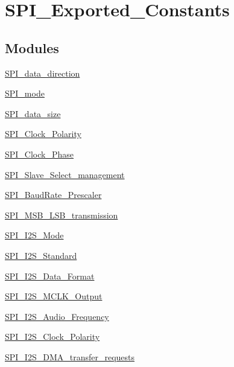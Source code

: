 \hypertarget{group___s_p_i___exported___constants}{\section{S\-P\-I\-\_\-\-Exported\-\_\-\-Constants}
\label{group___s_p_i___exported___constants}
}
\subsection*{Modules}
\begin{DoxyCompactItemize}
\item 
\hyperlink{group___s_p_i__data__direction}{S\-P\-I\-\_\-data\-\_\-direction}
\item 
\hyperlink{group___s_p_i__mode}{S\-P\-I\-\_\-mode}
\item 
\hyperlink{group___s_p_i__data__size}{S\-P\-I\-\_\-data\-\_\-size}
\item 
\hyperlink{group___s_p_i___clock___polarity}{S\-P\-I\-\_\-\-Clock\-\_\-\-Polarity}
\item 
\hyperlink{group___s_p_i___clock___phase}{S\-P\-I\-\_\-\-Clock\-\_\-\-Phase}
\item 
\hyperlink{group___s_p_i___slave___select__management}{S\-P\-I\-\_\-\-Slave\-\_\-\-Select\-\_\-management}
\item 
\hyperlink{group___s_p_i___baud_rate___prescaler}{S\-P\-I\-\_\-\-Baud\-Rate\-\_\-\-Prescaler}
\item 
\hyperlink{group___s_p_i___m_s_b___l_s_b__transmission}{S\-P\-I\-\_\-\-M\-S\-B\-\_\-\-L\-S\-B\-\_\-transmission}
\item 
\hyperlink{group___s_p_i___i2_s___mode}{S\-P\-I\-\_\-\-I2\-S\-\_\-\-Mode}
\item 
\hyperlink{group___s_p_i___i2_s___standard}{S\-P\-I\-\_\-\-I2\-S\-\_\-\-Standard}
\item 
\hyperlink{group___s_p_i___i2_s___data___format}{S\-P\-I\-\_\-\-I2\-S\-\_\-\-Data\-\_\-\-Format}
\item 
\hyperlink{group___s_p_i___i2_s___m_c_l_k___output}{S\-P\-I\-\_\-\-I2\-S\-\_\-\-M\-C\-L\-K\-\_\-\-Output}
\item 
\hyperlink{group___s_p_i___i2_s___audio___frequency}{S\-P\-I\-\_\-\-I2\-S\-\_\-\-Audio\-\_\-\-Frequency}
\item 
\hyperlink{group___s_p_i___i2_s___clock___polarity}{S\-P\-I\-\_\-\-I2\-S\-\_\-\-Clock\-\_\-\-Polarity}
\item 
\hyperlink{group___s_p_i___i2_s___d_m_a__transfer__requests}{S\-P\-I\-\_\-\-I2\-S\-\_\-\-D\-M\-A\-\_\-transfer\-\_\-requests}

\end{DoxyCompactItemize}

